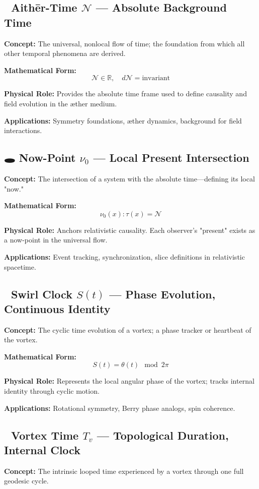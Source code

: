 \documentclass[12pt]{article}
\begin{document}
    \subsection*{🌌 Aithēr-Time $\mathcal{N}$ — Absolute Background Time}
    \textbf{Concept:} The universal, nonlocal flow of time; the foundation from which all other temporal phenomena are derived.

    \textbf{Mathematical Form:}
    \[
        \mathcal{N} \in \mathbb{R}, \quad d\mathcal{N} = \text{invariant}
    \]

    \textbf{Physical Role:} Provides the absolute time frame used to define causality and field evolution in the æther medium.

    \textbf{Applications:} Symmetry foundations, æther dynamics, background for field interactions.

    \subsection*{🕳️ Now-Point $\nu_0$ — Local Present Intersection}
    \textbf{Concept:} The intersection of a system with the absolute time—defining its local "now."

    \textbf{Mathematical Form:}
    \[
        \nu_0(x) : \tau(x) = \mathcal{N}
    \]

    \textbf{Physical Role:} Anchors relativistic causality. Each observer's "present" exists as a now-point in the universal flow.

    \textbf{Applications:} Event tracking, synchronization, slice definitions in relativistic spacetime.

    \subsection*{🔁 Swirl Clock $S(t)$ — Phase Evolution, Continuous Identity}
    \textbf{Concept:} The cyclic time evolution of a vortex; a phase tracker or heartbeat of the vortex.

    \textbf{Mathematical Form:}
    \[
        S(t) = \theta(t) \mod 2\pi
    \]

    \textbf{Physical Role:} Represents the local angular phase of the vortex; tracks internal identity through cyclic motion.

    \textbf{Applications:} Rotational symmetry, Berry phase analogs, spin coherence.

    \subsection*{🔄 Vortex Time $T_v$ — Topological Duration, Internal Clock}
    \textbf{Concept:} The intrinsic looped time experienced by a vortex through one full geodesic cycle.
\end{document}
